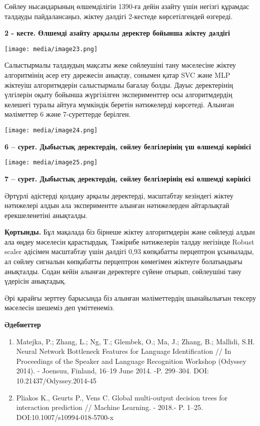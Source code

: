 \documentclass[
]{article}
\begin{document}
Сөйлеу нысандарының өлшемділігін 1390-ға дейін азайту үшін негізгі
құрамдас талдауды пайдалансаңыз, жіктеу дәлдігі 2-кестеде көрсетілгендей
өзгереді.

\textbf{2 - кесте. Өлшемді азайту арқылы деректер бойынша жіктеу
дәлдігі}

\texttt{[image: media/image23.png]}

Салыстырмалы талдаудың мақсаты жеке сөйлеушіні тану мәселесіне жіктеу
алгоритмінің әсер ету дәрежесін анықтау, сонымен қатар SVC және MLP
жіктеуіш алгоритмдерін салыстырмалы бағалау болды. Дауыс деректерінің
үлгілерін оқыту бойынша жүргізілген эксперименттер осы алгоритмдердің
келешегі туралы айтуға мүмкіндік беретін нәтижелерді көрсетеді. Алынған
мәліметтер 6 және 7-суреттерде берілген.

\texttt{[image: media/image24.png]}

\textbf{6 -- сурет. Дыбыстық деректердің, сөйлеу белгілерінің үш өлшемді
көрінісі}

\texttt{[image: media/image25.png]}

\textbf{7 -- сурет. Дыбыстық деректердің, сөйлеу белгілерінің екі
өлшемді көрінісі}

Әртүрлі әдістерді қолдану арқылы деректерді, масштабтау кезіндегі жіктеу
нәтижелері алдын ала экспериментте алынған нәтижелерден айтарлықтай
ерекшеленетіні анықталды.

\textbf{Қортынды.} Бұл мақалада біз бірнеше жіктеу алгоритмдерін және
сөйлеуді алдын ала өңдеу мәселесін қарастырдық. Тәжірибе нәтижелерін
талдау негізінде Robust scaler әдісімен масштабтау үшін дәлдігі 0,93
көпқабатты перцептрон ұсынылады, ал сөйлеу сигналын көпқабатты
перцептрон көмегімен жіктеуге болатындығы анықталды. Содан кейін алынған
деректерге сүйене отырып, сөйлеушіні тану үдерісін анықтадық.

Әрі қарайғы зерттеу барысында біз алынған мәліметтердің шынайылығын
тексеру мәселесін шешеміз деп үміттенеміз.

\textbf{Әдебиеттер}

\begin{enumerate}
\def\labelenumi{\arabic{enumi}.}
\item
  Matejka, P.; Zhang, L.; Ng, T.; Glembek, O.; Ma, J.; Zhang, B.;
  Mallidi, S.H. Neural Network Bottleneck Features for Language
  Identification // In Proceedings of the Speaker and Language
  Recognition Workshop (Odyssey 2014). - Joensuu, Finland, 16--19 June
  2014. -P. 299--304. DOI: 10.21437/Odyssey.2014-45
\item
  Pliakos K., Geurts P., Vens C. Global multi-output decision trees for
  interaction prediction // Machine Learning. - 2018.- P. 1--25.
  DOI:10.1007/s10994-018-5700-x
\end{enumerate}
\end{document}
